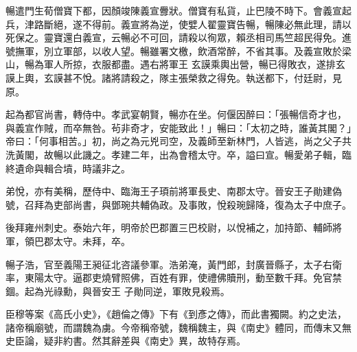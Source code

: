 \begin{pinyinscope}
 暢遣門生荀僧寶下都，因顏竣陳義宣釁狀。僧寶有私貨，止巴陵不時下。會義宣起兵，津路斷絕，遂不得前。義宣將為逆，使嬖人翟靈寶告暢，暢陳必無此理，請以死保之。靈寶還白義宣，云暢必不可回，請殺以徇眾，賴丞相司馬竺超民得免。進號撫軍，別立軍部，以收人望。暢雖署文檄，飲酒常醉，不省其事。及義宣敗於梁山，暢為軍人所掠，衣服都盡。遇右將軍王
 玄謨乘輿出營，暢已得敗衣，遂排玄謨上輿，玄謨甚不悅。諸將請殺之，隊主張榮救之得免。執送都下，付廷尉，見原。



 起為都官尚書，轉侍中。孝武宴朝賢，暢亦在坐。何偃因醉曰：「張暢信奇才也，與義宣作賊，而卒無咎。茍非奇才，安能致此！」暢曰：「太初之時，誰黃其閣？」帝曰：「何事相苦。」初，尚之為元兇司空，及義師至新林門，人皆逃，尚之父子共洗黃閣，故暢以此譏之。孝建二年，出為會稽太守。卒，謚曰宣。暢愛弟子輯，臨終遺命與輯合墳，時議非之。



 弟悅，亦有美稱，歷侍中、臨海王子頊前將軍長史、南郡太守。晉安王子勛建偽號，召拜為吏部尚書，與鄧琬共輔偽政。及事敗，悅殺琬歸降，復為太子中庶子。



 後拜雍州刺史。泰始六年，明帝於巴郡置三巴校尉，以悅補之，加持節、輔師將軍，領巴郡太守。未拜，卒。



 暢子浩，官至義陽王昶征北咨議參軍。浩弟淹，黃門郎，封廣晉縣子，太子右衛率，東陽太守。逼郡吏燒臂照佛，百姓有罪，使禮佛贖刑，動至數千拜。免官禁錮。起為光祿勳，與晉安王
 子勛同逆，軍敗見殺焉。



 臣穆等案《高氏小史》，《趙倫之傳》下有《到彥之傳》，而此書獨闕。約之史法，諸帝稱廟號，而謂魏為虜。今帝稱帝號，魏稱魏主，與《南史》體同，而傳末又無史臣論，疑非約書。然其辭差與《南史》異，故特存焉。



\end{pinyinscope}